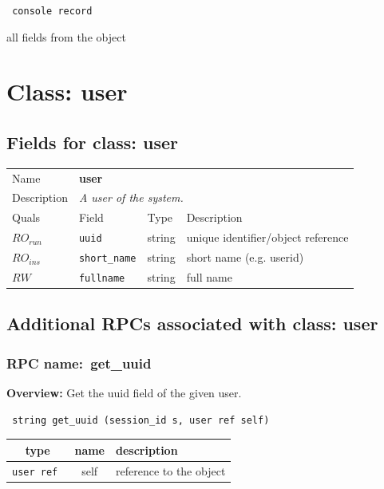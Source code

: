 \vspace{0.3cm}

{\tt 
console record
}


all fields from the object
\vspace{0.3cm}
\vspace{0.3cm}
\vspace{0.3cm}

\vspace{1cm}
\newpage
\section{Class: user}
\subsection{Fields for class: user}
\begin{longtable}{|lllp{}|}
\hline
\multicolumn{1}{|l}{Name} & \multicolumn{3}{l|}{\bf user} \\
\multicolumn{1}{|l}{Description} & \multicolumn{3}{l|}{\parbox{11cm}{\em A
user of the system.}} \\
\hline
Quals & Field & Type & Description \\
\hline
$\mathit{RO}_\mathit{run}$ &  {\tt uuid} & string & unique identifier/object reference \\
$\mathit{RO}_\mathit{ins}$ &  {\tt short\_name} & string & short name (e.g. userid) \\
$\mathit{RW}$ &  {\tt fullname} & string & full name \\
\hline
\end{longtable}
\subsection{Additional RPCs associated with class: user}
\subsubsection{RPC name:~get\_uuid}

{\bf Overview:} 
Get the uuid field of the given user.

\begin{verbatim} string get_uuid (session_id s, user ref self)\end{verbatim}



 
\vspace{0.3cm}
\begin{tabular}{|c|c|p{7cm}|}
 \hline
{\bf type} & {\bf name} & {\bf description} \\ \hline
{\tt user ref } & self & reference to the object \\ \hline 

\end{tabular}

